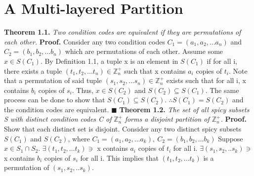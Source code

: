 \documentclass[12pt]{article}
\begin{document}
\section{A Multi-layered Partition}
\textbf{Theorem 1.1.} \textit{Two condition codes are equivalent if they are permutations of each other.} \newline
\textbf{Proof.}
Consider any two condition codes \(C_1=(a_1,a_2,...a_n)\) and \(C_2=(b_1,b_2,...b_n)\) which are permutations of each other.
\newline
Assume some \(x \in S(C_1)\).
\newline
By Definition 1.1, a tuple x is an element in \(S(C_1)\) if for all i, there exists a tuple \((t_1,t_2,...t_n)\in \mathbb{Z}_n^+\) such that x contains \(a_i\) copies of \(t_i\). \newline
\newline
Note that a permutation of said tuple \((s_1,s_2,...s_n)\in \mathbb{Z}_n^+\) exists such that for all i, x contains \(b_i\) copies of \(s_i\).
\newline
\newline
Thus, \(x \in S(C_2)\) and \(S(C_2) \subseteq S(C_1)\).
\newline
The same process can be done to show that \(S(C_1) \subseteq S(C_2)\).
\newline
\(\therefore S(C_1) = S(C_2)\) and the condition codes are equivalent.
\newline \(\blacksquare\) \newline \newline
\textbf{Theorem 1.2.} \textit{The set of all spicy subsets S with distinct condition codes C of} \(\mathbb{Z}_n^+\) \textit{forms a disjoint partition of \(\mathbb{Z}_n^+\).} \newline
\textbf{Proof. } Show that each distinct set is disjoint. \newline
Consider any two distinct spicy subsets \(S(C_1)\) and \(S(C_2)\),
where \newline
\(C_1=(a_1,a_2,...a_k),\ C_2=(b_1,b_2,...b_k)\)\newline
Suppose \(x\in S_1\cap S_2\). \newline
\(\exists (t_1,t_2,...t_k) \ni\) x contains \(a_i\) copies of \(t_i\) for all i. \newline
\(\exists (s_1,s_2,..s_k) \ni\) x contains \(b_i\) copies of \(s_i\) for all i.
\newline
This implies that \((t_1,t_2,...t_k)\) is a permutation of \((s_1,s_2,..s_k)\). \newline
\end{document}
